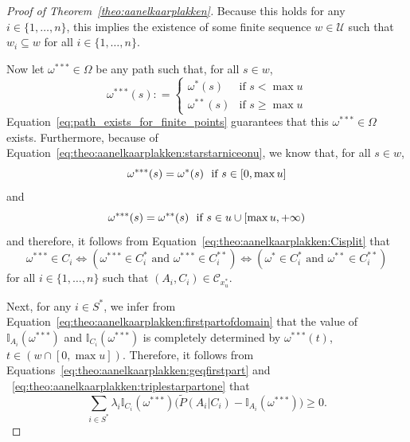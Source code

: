 \documentclass[10pt,a4paper]{paper}
\theoremstyle{definition}
\newcommand{\ind}[1]{\mathbb{I}_{#1}}
\newcommand{\coloneqq}{:\!=}
\begin{document}
\begin{proof}[Proof of Theorem~\ref{theo:aanelkaarplakken}]
Because this holds for any $i\in\{1,\ldots,n\}$, this implies the existence of some finite sequence $w\in\mathcal{U}$ such that $w_i\subseteq w$ for all $i\in\{1,\ldots,n\}$.

Now let $\omega^{***}\in\Omega$ be any path such that, for all $s\in w$,
\begin{equation*}%
\omega^{***}(s)\coloneqq
\begin{cases}
\omega^{*}(s) & \text{if $s<\max u$}\\
\omega^{**}(s) & \text{if $s\geq \max u$}
\end{cases}
\end{equation*}
Equation~\eqref{eq:path_exists_for_finite_points} guarantees that this $\omega^{***}\in\Omega$ exists. Furthermore, because of Equation~\eqref{eq:theo:aanelkaarplakken:starstarniceonu}, we know that, for all $s\in w$,
\begin{equation}\label{eq:theo:aanelkaarplakken:triplestarpartone}
\omega^{***}(s)=\omega^*(s)
\text{~~if $s\in [0,\max u]$}\vspace{-3mm}
\end{equation}
and
\begin{equation}\label{eq:theo:aanelkaarplakken:triplestarparttwo}
\omega^{***}(s)=\omega^{**}(s)
\text{~~if $s\in u\cup [\max u,+\infty)$}
\vspace{2mm}
\end{equation}
and therefore, it follows from Equation~\eqref{eq:theo:aanelkaarplakken:Cisplit} that
\begin{equation}\label{eq:theo:aanelkaarplakken:triplestarequivalence}
\omega^{***}\in C_i
\Leftrightarrow
(\omega^{***}\in C_i^*
\text{~and~}
\omega^{***}\in C_i^{**})
\Leftrightarrow
(\omega^{*}\in C_i^*
\text{~and~}
\omega^{**}\in C_i^{**})
\end{equation}
for all $i\in\{1,\dots,n\}$ such that $(A_i,C_i)\in\mathcal{C}_{x_u^*}$.


Next, for any $i\in S^*$, we infer from Equation~\eqref{eq:theo:aanelkaarplakken:firstpartofdomain} that the value of $\ind{A_i}(\omega^{***})$ and $\ind{C_i}(\omega^{***})$ is completely determined by $\omega^{***}(t)$, $t\in(w\cap[0,\max u])$. Therefore, it follows from Equations~\eqref{eq:theo:aanelkaarplakken:geqfirstpart} and ~\eqref{eq:theo:aanelkaarplakken:triplestarpartone} that 
\begin{equation}\label{eq:theo:aanelkaarplakken:geqfirstparttriplestar}
\sum_{i\in S^*}\lambda_i\ind{C_i}(\omega^{***})\bigl(\tilde{P}(A_i\vert C_i)-\ind{A_i}(\omega^{***})\bigr)
\geq0.
\end{equation}


\end{proof}
\end{document}
